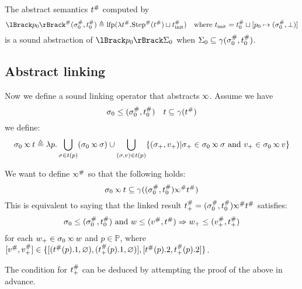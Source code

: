 \documentclass{article}
\begin{document}
The abstract semantics ${t}^{\#}$ computed by
\[\Abs{\sembracket{p_0}}(\Abs\ctx_0,\Abs\ptree_0)\triangleq\lfp(\lambda\Abs\ptree.\Abs\Step(\Abs\ptree)\sqcup\Abs{\ptree}_{\text{init}})\quad\text{where }\ptree_{\text{init}}=\Abs\ptree_0\sqcup[p_0\mapsto(\Abs\ctx_0,\bot)]\]
is a sound abstraction of $\sembracket{p_0}\Sigma_0$ when $\Sigma_0\subseteq\gamma({\sigma}^{\#}_0,{t}^{\#}_0)$.

\subsection{Abstract linking}
Now we define a sound linking operator that abstracts $\semlink$.
Assume we have
\[\sigma_0\le({\sigma}^{\#}_0,{t}^{\#}_0)\quad t\subseteq\gamma({t}^{\#})\]
we define:
\[\ctx_0\semlink\ptree\triangleq\lambda p.\bigcup_{\ctx\in t(p)}(\ctx_0\semlink\ctx)\cup\bigcup_{(\ctx,v)\in t(p)}\{(\ctx_+,v_+)|\ctx_+\in\ctx_0\semlink\ctx\text{ and }v_+\in\ctx_0\semlink v\}\]

We want to define $\Abs\semlink$ so that the following holds:
\[\ctx_0\semlink\ptree\subseteq\gamma((\Abs{\ctx}_0,\Abs{\ptree}_0)\Abs\semlink\Abs\ptree)\]
This is equivalent to saying that the linked result $\Abs\ptree_+=(\Abs\ctx_0,\Abs\ptree_0)\Abs\semlink\Abs\ptree$ satisfies:
\[\sigma_0\le({\sigma}^{\#}_0,{t}^{\#}_0)\text{ and }w\le({v}^{\#},{t}^{\#})\Rightarrow w_+\le({v}^{\#}_+,{t}^{\#}_+)\]
for each $w_+\in\ctx_0\semlink w$ and $p\in\mathbb{P}$,
where $[{v}^{\#},{v}^{\#}_+] \in \{[({t}^{\#}(p).1,\varnothing),({t}^{\#}_+(p).1,\varnothing)],[{t}^{\#}(p).2,{t}^{\#}_+(p).2]\}$.

The condition for ${t}^{\#}_+$ can be deduced by attempting the proof of the above in advance.
\end{document}
